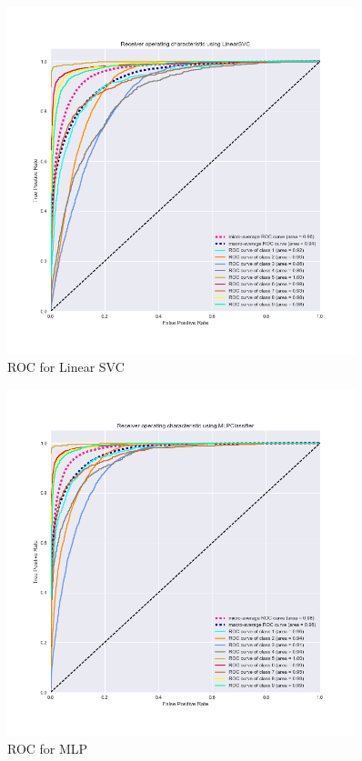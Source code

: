 \documentclass[a4paper,english,12pt]{article}
\begin{document}
\begin{figure}[H]
	\centering
	\includegraphics[width=0.9\textwidth,keepaspectratio]{ROC_OvR_LinearSVC}
	\caption{ROC for Linear SVC}
\end{figure}

\begin{figure}[H]
	\centering
	\includegraphics[width=0.9\textwidth,keepaspectratio]{ROC_OvR_MLPClassifier}
	\caption{ROC for MLP}
\end{figure}
\end{document}
